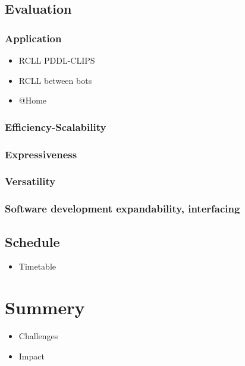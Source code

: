 \documentclass[a4paper,11pt]{article}
\begin{document}
\subsection{Evaluation}
\subsubsection{Application}
\begin{itemize}
\item RCLL PDDL-CLIPS
\item RCLL between bots
\item @Home
\end{itemize}
\subsubsection{Efficiency-Scalability}
\subsubsection{Expressiveness}
\subsubsection{Versatility}
\subsubsection{Software development expandability, interfacing}
\subsection{Schedule}
\begin{itemize}
\item Timetable
\end{itemize}

\section{Summery}
\begin{itemize}
\item Challenges
\item Impact
\end{itemize}



\end{document}
